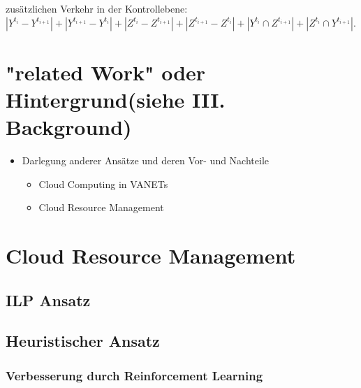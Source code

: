 \documentclass[conference]{IEEEtran}
\begin{document}
zusätzlichen Verkehr in der Kontrollebene:  \(|Y^{t_i}-Y^{t_{i+1}}|+|Y^{t_{i+1}}-Y^{t_{i}}|+|Z^{t_i}-Z^{t_{i+1}}|+|Z^{t_{i+1}}-Z^{t_{i}}|+|Y^{t_i} \cap Z^{t_{i+1}}|+|Z^{t_{i}} \cap Y^{t_{i+1}}|\).



\section{"related Work" oder Hintergrund(siehe III. Background)}
\begin{itemize}
\item Darlegung anderer Ansätze und deren Vor- und Nachteile
\begin{itemize}
\item Cloud Computing in VANETs
\item Cloud Resource Management
\end{itemize}
\end{itemize}

\section{Cloud Resource Management}
\subsection{ILP Ansatz}
\subsection{Heuristischer Ansatz}
\subsubsection{Verbesserung durch Reinforcement Learning}




\end{document}
